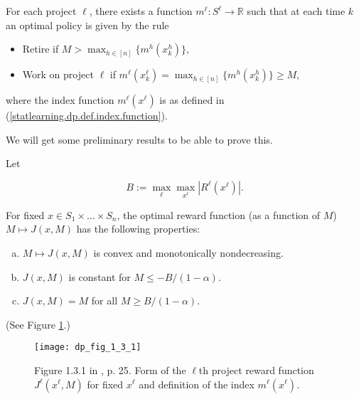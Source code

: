 \begin{theorem}\label{statlearning.dp.prop.1.3.4.v2}

For each project \(\ell\), there exists a function \(m^\ell: S^\ell \to \mathbb{R}\) such that at each time \(k\) an optimal policy is given by the rule

\begin{itemize}

\item Retire if \(M > \max_{h \in [n]}\{m^{h}(x_k^{h})\}\),

\item Work on project \(\ell\) if \(m^\ell(x_k^\ell) = \max_{h \in [n]}\{m^{h}(x_k^{h}) \} \geq M\),

\end{itemize}

where the index function \(m^\ell(x^\ell)\) is as defined in (\ref{statlearning.dp.def.index.function}).

\end{theorem}

We will get some preliminary results to be able to prove this.

\begin{lemma}\label{statlearning.dp.prop.1.3.1.v2}

Let 

\[
B := \max_\ell \max_{x^\ell} | R^\ell(x^\ell)|.
\]

For fixed \(x \in S_1 \times \ldots \times S_n\), the optimal reward function (as a function of \(M\)) \(M \mapsto J(x,M)\) has the following properties:

\begin{enumerate}[(a)]

\item \(M \mapsto J(x,M)\) is convex and monotonically nondecreasing.

\item \(J(x, M)\) is constant for \(M \leq -B/(1-\alpha)\).

\item \(J(x,M) = M\) for all \(M \geq B/(1-\alpha)\).

\end{enumerate}

(See Figure \ref{dp_fig_1_3_1_fig}.)

\end{lemma}

\begin{figure}[htbp]
\begin{center}
\texttt{[image: dp\_fig\_1\_3\_1]}
\caption{Figure 1.3.1 in \citet{v2_bertsekas2012dynamic}, p. 25. Form of the \(\ell\)th project reward function \(J^\ell(x^\ell, M)\) for fixed \(x^\ell\) and definition of the index \(m^\ell(x^\ell)\).}
\label{dp_fig_1_3_1_fig}
\end{center}
\end{figure}


